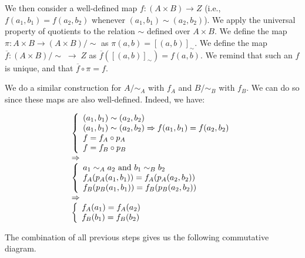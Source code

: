 \documentclass[12pt, letterpaper, twoside]{report}
\begin{document}
We then consider a well-defined map $f : (A \times B) \to Z$ (i.e., $f(a_1, b_1) = f(a_2, b_2)$ whenever $(a_1, b_1) \sim (a_2, b_2)$). We apply the universal property of quotients to the relation $\sim$ defined over $A \times B$. We define the map $\pi : A \times B \to (A \times B)/\sim$ as $\pi(a,b) = [(a,b)]_\sim$. We define the map $\overline{f} : (A \times B)/\sim \; \to \; Z$ as $\overline{f}([(a,b)]_\sim) = f(a,b)$. We remind that such an $f$ is unique, and that $\overline{f} \circ \pi = f$.

We do a similar construction for $A/\sim_A$ with $f_A$ and $B/\sim_B$ with $f_B$. We can do so since these maps are also well-defined. Indeed, we have:

$$
\begin{array}{l}
	\left\{
	\begin{array}{l}
		(a_1, b_1) \sim (a_2, b_2) \\
		(a_1, b_1) \sim (a_2, b_2) \Rightarrow f(a_1, b_1) = f(a_2, b_2) \\
		f = f_A \circ p_A \\
		f = f_B \circ p_B
	\end{array}
	\right.
\cr \Rightarrow \\
	\left\{
	\begin{array}{l}
		a_1 \sim_A a_2 \text{ and } b_1 \sim_B b_2 \\
		f_A(p_A(a_1, b_1)) = f_A(p_A(a_2, b_2)) \\
		f_B(p_B(a_1, b_1)) = f_B(p_B(a_2, b_2)) 
	\end{array}
	\right.
\cr \Rightarrow \\
	\left\{
	\begin{array}{l}
		f_A(a_1) = f_A(a_2) \\
		f_B(b_1) = f_B(b_2) 
	\end{array}
	\right.
\end{array}
$$

The combination of all previous steps gives us the following commutative diagram.
\end{document}
